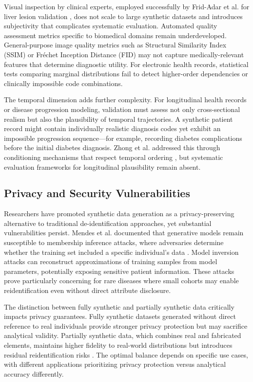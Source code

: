 Visual inspection by clinical experts, employed successfully by Frid-Adar et al. for liver lesion validation \cite{fridadar2018gan}, does not scale to large synthetic datasets and introduces subjectivity that complicates systematic evaluation. Automated quality assessment metrics specific to biomedical domains remain underdeveloped. General-purpose image quality metrics such as Structural Similarity Index (SSIM) or Fréchet Inception Distance (FID) may not capture medically-relevant features that determine diagnostic utility. For electronic health records, statistical tests comparing marginal distributions fail to detect higher-order dependencies or clinically impossible code combinations.

The temporal dimension adds further complexity. For longitudinal health records or disease progression modeling, validation must assess not only cross-sectional realism but also the plausibility of temporal trajectories. A synthetic patient record might contain individually realistic diagnosis codes yet exhibit an impossible progression sequence—for example, recording diabetes complications before the initial diabetes diagnosis. Zhong et al. addressed this through conditioning mechanisms that respect temporal ordering \cite{zhong2024meddiffusion}, but systematic evaluation frameworks for longitudinal plausibility remain absent.

\subsection{Privacy and Security Vulnerabilities}

Researchers have promoted synthetic data generation as a privacy-preserving alternative to traditional de-identification approaches, yet substantial vulnerabilities persist. Mendes et al. documented that generative models remain susceptible to membership inference attacks, where adversaries determine whether the training set included a specific individual's data \cite{mendes2025synthetic}. Model inversion attacks can reconstruct approximations of training samples from model parameters, potentially exposing sensitive patient information. These attacks prove particularly concerning for rare diseases where small cohorts may enable reidentification even without direct attribute disclosure.

The distinction between fully synthetic and partially synthetic data critically impacts privacy guarantees. Fully synthetic datasets generated without direct reference to real individuals provide stronger privacy protection but may sacrifice analytical validity. Partially synthetic data, which combines real and fabricated elements, maintains higher fidelity to real-world distributions but introduces residual reidentification risks \cite{mendes2025synthetic}. The optimal balance depends on specific use cases, with different applications prioritizing privacy protection versus analytical accuracy differently.

